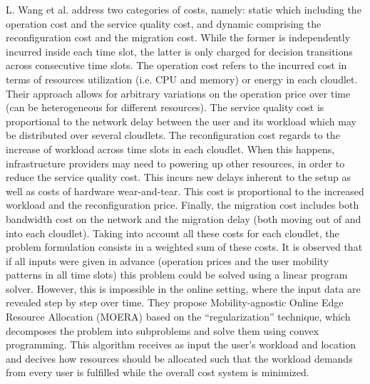 \noindent\tab L. Wang \cite{wang2018moera} et al. address two categories of costs, namely: static which including the operation cost and the service quality cost, and dynamic comprising the reconfiguration cost and the migration cost. While the former is independently incurred inside each time slot, the latter is only charged for decision transitions across consecutive time slots. The operation cost refers to the incurred cost in terms of resources utilization (i.e. CPU and memory) or energy in each cloudlet. Their approach allows for arbitrary variations on the operation price over time (can be heterogeneous for different resources). The service quality cost is proportional to the network delay between the user and its workload which may be distributed over several cloudlets. The reconfiguration cost regards to the increase of workload across time slots in each cloudlet. When this happens, infrastructure providers may need to powering up other resources, in order to reduce the service quality cost. This incurs new delays inherent to the setup as well as costs of hardware wear-and-tear. This cost is proportional to the increased workload and the reconfiguration price. Finally, the migration cost includes both bandwidth cost on the network and the migration delay (both moving out of and into each cloudlet). Taking into account all these costs for each cloudlet, the problem formulation consists in a weighted sum of these costs. It is observed that if all inputs were given in advance (operation prices and the user mobility patterns in all time slots) this problem could be solved using a linear program solver. However, this is impossible in the online setting, where
the input data are revealed step by step over time. They propose Mobility-agnostic Online Edge Resource Allocation (MOERA) based on the ``regularization'' technique, which decomposes the problem into subproblems and solve them using convex programming. This algorithm receives as input the user’s workload and location and decives how resources should be allocated such that the workload demands from every user is fulfilled while the overall cost system is minimized.
